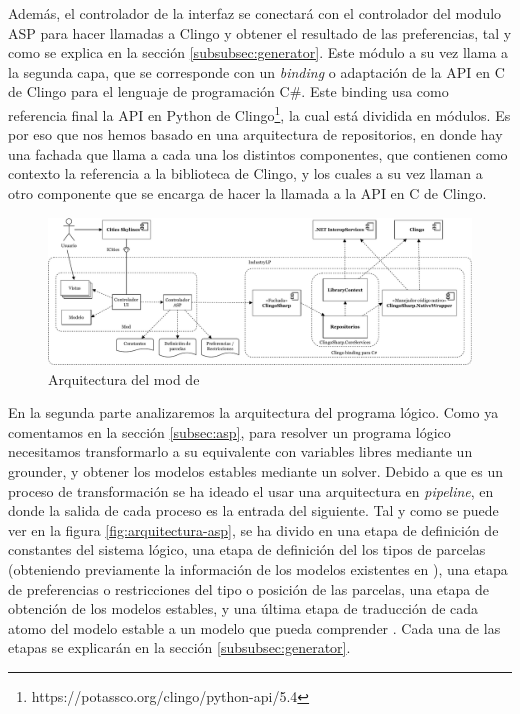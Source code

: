 Además, el controlador de la interfaz se conectará con el controlador del modulo ASP para hacer llamadas a Clingo y obtener el resultado de las preferencias, tal y como se explica en la sección \ref{subsubsec:generator}. Este módulo a su vez llama a la segunda capa, que se corresponde con un \textit{binding} o adaptación de la API en C de Clingo para el lenguaje de programación C\#. Este binding usa como referencia final la API en Python de Clingo\footnote{https://potassco.org/clingo/python-api/5.4}, la cual está dividida en módulos. Es por eso que nos hemos basado en una arquitectura de repositorios, en donde hay una fachada que llama a cada una los distintos componentes, que contienen como contexto la referencia a la biblioteca de Clingo, y los cuales a su vez llaman a otro componente que se encarga de hacer la llamada a la API en C de Clingo. \\

\begin{figure}[!h]
	\centering
	\includegraphics[width=\textwidth]{images/arquitectura-mod}
	\caption{Arquitectura del mod de \cities}
	\label{fig:arquitectura-mod}
\end{figure}

En la segunda parte analizaremos la arquitectura del programa lógico. Como ya comentamos en la sección \ref{subsec:asp}, para resolver un programa lógico necesitamos transformarlo a su equivalente con variables libres mediante un grounder, y obtener los modelos estables mediante un solver. Debido a que es un proceso de transformación se ha ideado el usar una arquitectura en \textit{pipeline}, en donde la salida de cada proceso es la entrada del siguiente. Tal y como se puede ver en la figura \ref{fig:arquitectura-asp}, se ha divido en una etapa de definición de constantes del sistema lógico, una etapa de definición del los tipos de parcelas (obteniendo previamente la información de los modelos existentes en \cities), una etapa de preferencias o restricciones del tipo o posición de las parcelas, una etapa de obtención de los modelos estables, y una última etapa de traducción de cada atomo del modelo estable a un modelo que pueda comprender \cities. Cada una de las etapas se explicarán en la sección \ref{subsubsec:generator}.

